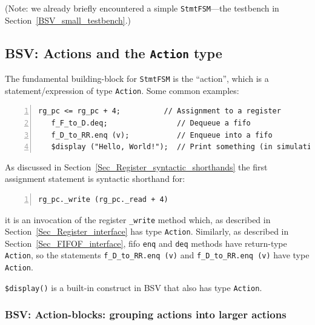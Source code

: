 (Note: we already briefly encountered a simple \verb|StmtFSM|---the
testbench in Section~\ref{BSV_small_testbench}.)


\subsection{BSV: Actions and the {\tt Action} type}


The fundamental building-block for \verb|StmtFSM| is the ``action'',
which is a statement/expression of type \verb|Action|.  Some common
examples:

\begin{Verbatim}[frame=single, numbers=left]
   rg_pc <= rg_pc + 4;          // Assignment to a register
   f_F_to_D.deq;                // Dequeue a fifo
   f_D_to_RR.enq (v);           // Enqueue into a fifo
   $display ("Hello, World!");  // Print something (in simulation only)
\end{Verbatim}

As discussed in
Section~\ref{Sec_Register_syntactic_shorthands}
the first assignment statement is syntactic shorthand for:

\begin{Verbatim}[frame=single, numbers=left]
   rg_pc._write (rg_pc._read + 4)
\end{Verbatim}

{\ie} it is an invocation of the register \verb|_write| method which,
as described in
Section~\ref{Sec_Register_interface} has type
\verb|Action|.  Similarly, as described in
Section~\ref{Sec_FIFOF_interface}, fifo \verb|enq|
and \verb|deq| methods have return-type \verb|Action|, so the
statements \verb|f_D_to_RR.enq (v)| and \verb|f_D_to_RR.enq (v)| have
type \verb|Action|.


\verb|$display()| is a built-in construct in BSV that also has type
\verb|Action|.


\subsubsection{BSV: Action-blocks: grouping actions into larger actions}

